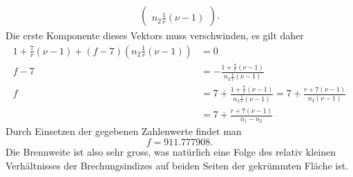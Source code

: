 \begin{loesung}
\begin{align*}
\begin{pmatrix}
\\
n_2\frac1r(\nu-1)
\end{pmatrix}.
\end{align*}
Die erste Komponente dieses Vektors muss verschwinden, es gilt daher
\begin{align*}
1+\frac7r(\nu-1)
+
(f-7)(n_2\frac1r(\nu-1))
&=
0
\\
f-7
&=
-\frac{1+\frac7r(\nu-1)}{ n_2\frac1r(\nu-1) }
\\
f
&=
7
+\frac{1+\frac7r(\nu-1)}{ n_2\frac1r(\nu-1) }
=
7
+\frac{r+7(\nu-1)}{ n_2(\nu-1) }
\\
&=
7
+\frac{r+7(\nu-1)}{ n_1 -n_2 }
\end{align*}
Durch Einsetzen der gegebenen Zahlenwerte findet man
\[
f=911.777908.
\]
Die Brennweite ist also sehr gross, was natürlich eine Folge des
relativ kleinen Verhältnisses der Brechungsindizes auf beiden
Seiten der gekrümmten Fläche ist.
\end{loesung}


